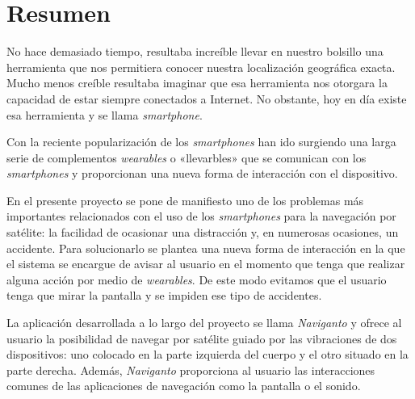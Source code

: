 \chapter{Resumen}

No hace demasiado tiempo, resultaba increíble llevar en nuestro bolsillo una herramienta que nos
permitiera conocer nuestra localización geográfica exacta. Mucho menos creíble resultaba imaginar
que esa herramienta nos otorgara la capacidad de estar siempre conectados a Internet. No obstante,
hoy en día existe esa herramienta y se llama \emph{smartphone}.

Con la reciente popularización de los \emph{smartphones} han ido surgiendo una larga serie de
complementos \emph{wearables} o «llevarbles» que se comunican con los \emph{smartphones} y
proporcionan una nueva forma de interacción con el dispositivo.

En el presente proyecto se pone de manifiesto uno de los problemas más importantes relacionados con
el uso de los \emph{smartphones} para la navegación por satélite: la facilidad de ocasionar una
distracción y, en numerosas ocasiones, un accidente. Para solucionarlo se plantea una nueva forma de
interacción en la que el sistema se encargue de avisar al usuario en el momento que tenga que
realizar alguna acción por medio de \emph{wearables}. De este modo evitamos que el usuario tenga que
mirar la pantalla y se impiden ese tipo de accidentes.

La aplicación desarrollada a lo largo del proyecto se llama \emph{Naviganto} y ofrece al usuario la
posibilidad de navegar por satélite guiado por las vibraciones de dos dispositivos: uno colocado en
la parte izquierda del cuerpo y el otro situado en la parte derecha. Además, \emph{Naviganto}
proporciona al usuario las interacciones comunes de las aplicaciones de navegación como la pantalla
o el sonido.

